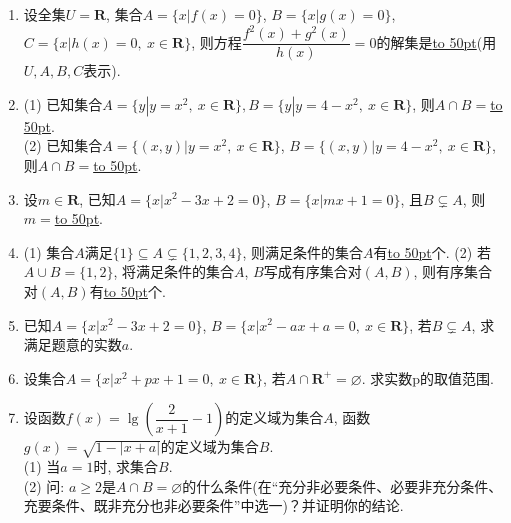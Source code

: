 \documentclass[10pt,a4paper]{article}
\newcommand{\blank}[1]{\underline{\hbox to #1pt{}}}
\begin{document}
\begin{enumerate}[1.]
\item 设全集$U=\mathbf{R}$, 集合$A=\{x|f(x)=0\}$, $B=\{x|g(x)=0\}$, $C=\{x|h(x)=0, \ x\in \mathbf{R}\}$, 则方程$\dfrac{f^2(x)+g^2(x)}{h(x)}=0$的解集是\blank{50}(用$U,A,B,C$表示).
\item (1) 已知集合$A=\{y|y=x^2, \ x\in \mathbf{R}\}, B=\{y|y=4-x^2, \ x\in \mathbf{R}\}$, 则$A\cap B=$\blank{50}.\\
(2) 已知集合$A=\{(x,y)|y={x^2},\ x\in \mathbf{R}\}$, $B=\{(x,y)|y=4-x^2, \ x\in \mathbf{R}\}$, 则$A\cap B=$\blank{50}.
\item 设$m\in \mathbf{R}$, 已知$A=\{x|x^2-3x+2=0\}$, $B=\{x|mx+1=0\}$, 且$B\subsetneq A$, 则$m=$\blank{50}.
\item (1) 集合$A$满足$\{1\}\subseteq A \subsetneq \{1,2,3,4\}$, 则满足条件的集合$A$有\blank{50}个.
(2) 若$A\cup B=\{1,2\}$, 将满足条件的集合$A$, $B$写成有序集合对$(A,B)$, 则有序集合对$(A,B)$有\blank{50}个.
\item 已知$A=\{x|x^2-3x+2=0\}$, $B=\{x|x^2-ax+a=0, \ x\in \mathbf{R}\}$, 若$B\subsetneq A$, 求满足题意的实数$a$.
\item 设集合$A=\{x|x^2+px+1=0,\ x\in \mathbf{R}\}$, 若$A\cap \mathbf{R}^+=\varnothing$. 求实数p的取值范围.
\item 设函数$f(x)=\lg (\dfrac2{x+1}-1)$的定义域为集合$A$, 函数$g(x)=\sqrt{1-|x+a|}$的定义域为集合$B$.\\
(1) 当$a=1$时, 求集合$B$.\\
(2) 问: $a\ge 2$是$A\cap B=\varnothing$的什么条件(在``充分非必要条件、必要非充分条件、充要条件、既非充分也非必要条件''中选一)？并证明你的结论.



\end{enumerate}
\end{document}
